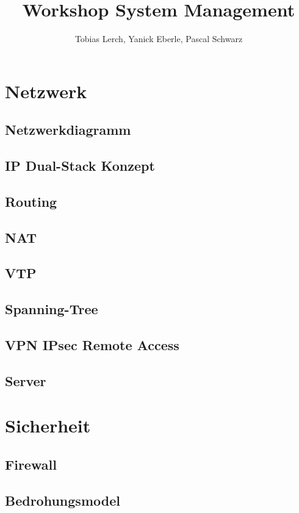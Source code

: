 \documentclass[11pt,a4paper,parskip=half]{scrartcl}
\title{Workshop System Management}
\author{Tobias Lerch, Yanick Eberle, Pascal Schwarz}
\begin{document}
\maketitle
\newpage

\section{Netzwerk}
\subsection{Netzwerkdiagramm}
\subsection{IP Dual-Stack Konzept}
\subsection{Routing}
\subsection{NAT}
\subsection{VTP}
\subsection{Spanning-Tree}
\subsection{VPN IPsec Remote Access}
\subsection{Server}

\section{Sicherheit}
\subsection{Firewall}
\subsection{Bedrohungsmodel}
\end{document}
